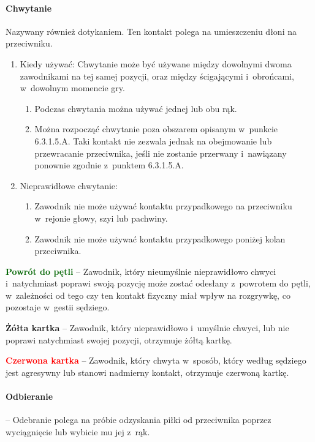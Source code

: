 \documentclass[12pt]{article}
\newcommand\redcard[1]{\bgroup\textcolor{red}{\textbf{#1}}}
\newcommand\yellowcard[1]{\bgroup\textcolor{darkyellow}{\textbf{#1}}}
\newcommand\other[1]{\bgroup\textcolor{darkgreen}{\textbf{#1}}}
\begin{document}
\paragraph{Chwytanie}
Nazywany również dotykaniem. Ten kontakt
polega na umieszczeniu dłoni na przeciwniku.

\begin{enumerate}
	\item
	      Kiedy używać: Chwytanie może być używane między dowolnymi dwoma
	      zawodnikami na tej samej pozycji, oraz między ścigającymi i~obrońcami,
	      w~dowolnym momencie gry.

	      \begin{enumerate}
		      \item
		            Podczas chwytania można używać jednej lub obu rąk.
		      \item
		            Można rozpocząć chwytanie poza obszarem opisanym w~punkcie
		            6.3.1.5.A. Taki kontakt nie zezwala jednak na obejmowanie lub
		            przewracanie przeciwnika, jeśli nie zostanie przerwany i~nawiązany
		            ponownie zgodnie z~punktem 6.3.1.5.A.
	      \end{enumerate}
	\item
	      Nieprawidłowe chwytanie:

	      \begin{enumerate}
		      \item
		            Zawodnik nie może używać kontaktu przypadkowego na przeciwniku w~rejonie głowy, szyi lub pachwiny.
		      \item
		            Zawodnik nie może używać kontaktu przypadkowego poniżej kolan
		            przeciwnika.
	      \end{enumerate}
\end{enumerate}

\other{Powrót do pętli} -- Zawodnik, który nieumyślnie nieprawidłowo
chwyci i~natychmiast poprawi swoją pozycję może zostać odesłany z~powrotem do pętli, w~zależności od tego czy ten kontakt fizyczny miał
wpływ na rozgrywkę, co pozostaje w~gestii sędziego.

\yellowcard{Żółta kartka} -- Zawodnik, który nieprawidłowo i~umyślnie chwyci,
lub nie poprawi natychmiast swojej pozycji, otrzymuje żółtą kartkę.

\redcard{Czerwona kartka} -- Zawodnik, który chwyta w~sposób, który według
sędziego jest agresywny lub stanowi nadmierny kontakt, otrzymuje
czerwoną kartkę.

\paragraph{Odbieranie} -- Odebranie polega na próbie odzyskania
piłki od przeciwnika poprzez wyciągnięcie lub wybicie mu jej z~rąk.
\end{document}
